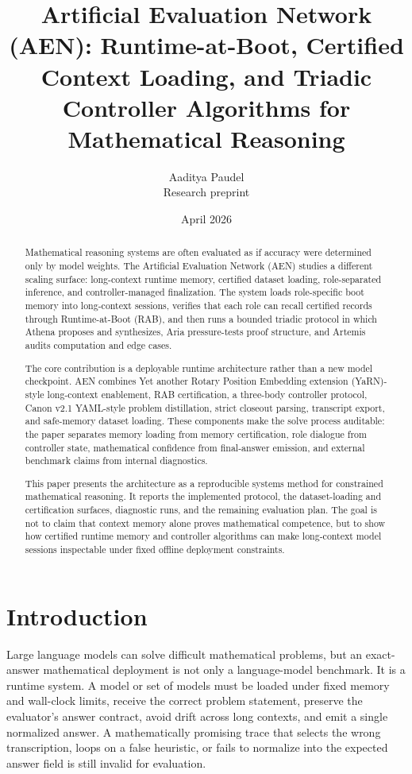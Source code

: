 \documentclass[11pt]{article}
\title{Artificial Evaluation Network (AEN): Runtime-at-Boot, Certified Context Loading, and Triadic Controller Algorithms for Mathematical Reasoning}
\author{
  Aaditya Paudel \\
  \small Research preprint
}
\date{April 2026}
\newcommand{\systemname}{AEN}
\newcommand{\athena}{Athena}
\newcommand{\aria}{Aria}
\newcommand{\artemis}{Artemis}
\newcommand{\rab}{RAB}
\begin{document}
\maketitle

\begin{abstract}
Mathematical reasoning systems are often evaluated as if accuracy were determined only by model weights. The Artificial Evaluation Network (\systemname{}) studies a different scaling surface: long-context runtime memory, certified dataset loading, role-separated inference, and controller-managed finalization. The system loads role-specific boot memory into long-context sessions, verifies that each role can recall certified records through Runtime-at-Boot (\rab{}), and then runs a bounded triadic protocol in which \athena{} proposes and synthesizes, \aria{} pressure-tests proof structure, and \artemis{} audits computation and edge cases.

The core contribution is a deployable runtime architecture rather than a new model checkpoint. AEN combines Yet another Rotary Position Embedding extension (YaRN)-style long-context enablement, \rab{} certification, a three-body controller protocol, Canon v2.1 YAML-style problem distillation, strict closeout parsing, transcript export, and safe-memory dataset loading. These components make the solve process auditable: the paper separates memory loading from memory certification, role dialogue from controller state, mathematical confidence from final-answer emission, and external benchmark claims from internal diagnostics.

This paper presents the architecture as a reproducible systems method for constrained mathematical reasoning. It reports the implemented protocol, the dataset-loading and certification surfaces, diagnostic runs, and the remaining evaluation plan. The goal is not to claim that context memory alone proves mathematical competence, but to show how certified runtime memory and controller algorithms can make long-context model sessions inspectable under fixed offline deployment constraints.
\end{abstract}

\tableofcontents
\clearpage

\section{Introduction}

Large language models can solve difficult mathematical problems, but an exact-answer mathematical deployment is not only a language-model benchmark. It is a runtime system. A model or set of models must be loaded under fixed memory and wall-clock limits, receive the correct problem statement, preserve the evaluator's answer contract, avoid drift across long contexts, and emit a single normalized answer. A mathematically promising trace that selects the wrong transcription, loops on a false heuristic, or fails to normalize into the expected answer field is still invalid for evaluation.
\end{document}
